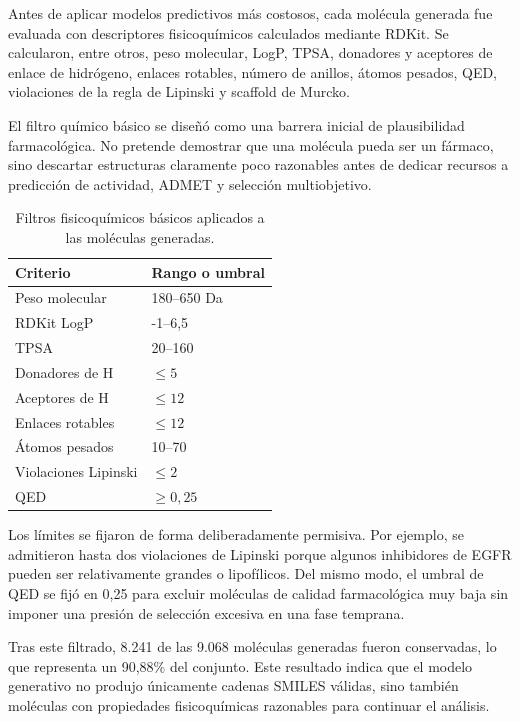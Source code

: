 \documentclass[IB]{TFUOC}%
\begin{document}
Antes de aplicar modelos predictivos más costosos, cada molécula generada fue evaluada con descriptores fisicoquímicos calculados mediante RDKit. Se calcularon, entre otros, peso molecular, LogP, TPSA, donadores y aceptores de enlace de hidrógeno, enlaces rotables, número de anillos, átomos pesados, QED, violaciones de la regla de Lipinski y scaffold de Murcko.

El filtro químico básico se diseñó como una barrera inicial de plausibilidad farmacológica. No pretende demostrar que una molécula pueda ser un fármaco, sino descartar estructuras claramente poco razonables antes de dedicar recursos a predicción de actividad, ADMET y selección multiobjetivo.

\begin{table}[H]
    \centering
    \small
    \begin{tabular}{p{5cm} p{5cm}}
        \hline
        \textbf{Criterio} & \textbf{Rango o umbral} \\
        \hline
        Peso molecular & 180--650 Da \\
        \hline
        RDKit LogP & -1--6,5 \\
        \hline
        TPSA & 20--160 \\
        \hline
        Donadores de H & $\leq 5$ \\
        \hline
        Aceptores de H & $\leq 12$ \\
        \hline
        Enlaces rotables & $\leq 12$ \\
        \hline
        Átomos pesados & 10--70 \\
        \hline
        Violaciones Lipinski & $\leq 2$ \\
        \hline
        QED & $\geq 0,25$ \\
        \hline
    \end{tabular}
    \caption{Filtros fisicoquímicos básicos aplicados a las moléculas generadas.}
    \label{tab:filtros_basicos}
\end{table}

Los límites se fijaron de forma deliberadamente permisiva. Por ejemplo, se admitieron hasta dos violaciones de Lipinski porque algunos inhibidores de EGFR pueden ser relativamente grandes o lipofílicos. Del mismo modo, el umbral de QED se fijó en 0,25 para excluir moléculas de calidad farmacológica muy baja sin imponer una presión de selección excesiva en una fase temprana.

Tras este filtrado, 8.241 de las 9.068 moléculas generadas fueron conservadas, lo que representa un 90,88\% del conjunto. Este resultado indica que el modelo generativo no produjo únicamente cadenas SMILES válidas, sino también moléculas con propiedades fisicoquímicas razonables para continuar el análisis.
\end{document}
